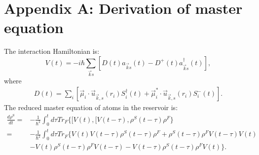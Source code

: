 \documentclass{article}
\begin{document}
\appendix

\section{Appendix A: Derivation of master equation}
The interaction Hamiltonian is:
\begin{equation}
\label{eqa0}\tag{A1}
V(t)=-i\hbar \sum_{\vec{k}s}[D(t)a_{\vec{k}s}(t)-D^{+}(t)a^{\dagger}_{\vec{k}s}(t)],
\end{equation}
where
\begin{equation}
\label{eqa1}\tag{A2}
\begin{gathered}
 D(t)=\underset{i}{\sum}[\vec{\mu}_{i}\cdot\vec{u}_{\vec{k},s}(r_{i})S_{i}^{\dagger}(t)+\vec{\mu}^{*}_{i}\cdot\vec{u}_{\vec{k},s}(r_{i})S_{i}^{-}(t)]. 
 \end{gathered}
\end{equation}
The reduced master equation of atoms in the reservoir is:
\begin{equation}
\label{eqa2}\tag{A3}
\begin{split}
\frac{d\rho^{S}}{dt}=&-\frac{1}{\hbar^{2}}\int_{0}^{t}d\tau Tr_{F}\{[V(t),[V(t-\tau),\rho^{S}(t-\tau)\rho^{F}\}\\
=&-\frac{1}{\hbar^{2}}\int_{0}^{t}d\tau Tr_{F}\{V(t)V(t-\tau)\rho^{S}(t-\tau)\rho^{F}+\rho^{S}(t-\tau)\rho^{F}V(t-\tau)V(t)\\
&-V(t)\rho^{S}(t-\tau)\rho^{F}V(t-\tau)-V(t-\tau)\rho^{S}(t-\tau)\rho^{F}V(t)\}.
\end{split}
\end{equation} 
\end{document}
